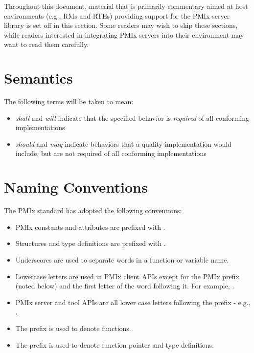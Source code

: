 \advicermstart
Throughout this document, material that is primarily commentary aimed at host environments (e.g., \acp{RM} and \acp{RTE}) providing support for the \ac{PMIx} server library is set off in this section.
Some readers may wish to skip these sections, while readers interested in integrating \ac{PMIx} servers into their environment may want to read them carefully.
\advicermend

\section{Semantics}

The following terms will be taken to mean:

\begin{itemize}
\item \emph{shall} and \emph{will} indicate that the specified behavior is \emph{required} of all conforming implementations
\item \emph{should} and \emph{may} indicate behaviors that a quality implementation would include, but are not required of all conforming implementations
\end{itemize}

\section{Naming Conventions}

The \ac{PMIx} standard has adopted the following conventions:

\begin{itemize}
\item \ac{PMIx} constants and attributes are prefixed with \textbf{}.
\item Structures and type definitions are prefixed with .
\item Underscores are used to separate words in a function or variable name.
\item Lowercase letters are used in \ac{PMIx} client \acp{API} except for the \ac{PMIx} prefix (noted below) and the first letter of the word following it.
For example, .
\item \ac{PMIx} server and tool \acp{API} are all lower case letters following the prefix - e.g., .
\item The  prefix is used to denote functions.
\item The  prefix is used to denote function pointer and type definitions.
\end{itemize}

